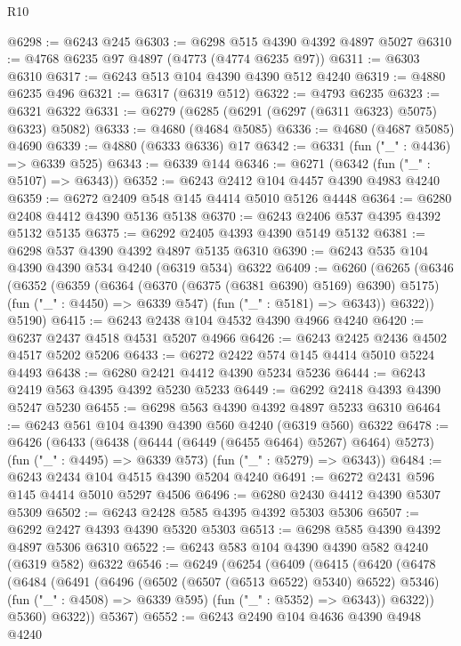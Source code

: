 \begin{lexlean}{R10}
\begin{coremodule}
@6298 := @6243 @245
@6303 := @6298 @515 @4390 @4392 @4897 @5027
@6310 := @4768 @6235 @97 @4897 (@4773 (@4774 @6235 @97))
@6311 := @6303 @6310
@6317 := @6243 @513 @104 @4390 @4390 @512 @4240
@6319 := @4880 @6235 @496
@6321 := @6317 (@6319 @512)
@6322 := @4793 @6235
@6323 := @6321 @6322
@6331 := @6279 (@6285 (@6291 (@6297 (@6311 @6323) @5075) @6323) @5082)
@6333 := @4680 (@4684 @5085)
@6336 := @4680 (@4687 @5085) @4690
@6339 := @4880 (@6333 @6336) @17
@6342 := @6331 (fun ("_" : @4436) => @6339 @525)
@6343 := @6339 @144
@6346 := @6271 (@6342 (fun ("_" : @5107) => @6343))
@6352 := @6243 @2412 @104 @4457 @4390 @4983 @4240
@6359 := @6272 @2409 @548 @145 @4414 @5010 @5126 @4448
@6364 := @6280 @2408 @4412 @4390 @5136 @5138
@6370 := @6243 @2406 @537 @4395 @4392 @5132 @5135
@6375 := @6292 @2405 @4393 @4390 @5149 @5132
@6381 := @6298 @537 @4390 @4392 @4897 @5135 @6310
@6390 := @6243 @535 @104 @4390 @4390 @534 @4240 (@6319 @534) @6322
@6409 := @6260
    (@6265
      (@6346
        (@6352
          (@6359
            (@6364 (@6370 (@6375 (@6381 @6390) @5169) @6390) @5175)
            (fun ("_" : @4450) => @6339 @547)
            (fun ("_" : @5181) => @6343))
          @6322))
      @5190)
@6415 := @6243 @2438 @104 @4532 @4390 @4966 @4240
@6420 := @6237 @2437 @4518 @4531 @5207 @4966
@6426 := @6243 @2425 @2436 @4502 @4517 @5202 @5206
@6433 := @6272 @2422 @574 @145 @4414 @5010 @5224 @4493
@6438 := @6280 @2421 @4412 @4390 @5234 @5236
@6444 := @6243 @2419 @563 @4395 @4392 @5230 @5233
@6449 := @6292 @2418 @4393 @4390 @5247 @5230
@6455 := @6298 @563 @4390 @4392 @4897 @5233 @6310
@6464 := @6243 @561 @104 @4390 @4390 @560 @4240 (@6319 @560) @6322
@6478 := @6426
    (@6433
      (@6438 (@6444 (@6449 (@6455 @6464) @5267) @6464) @5273)
      (fun ("_" : @4495) => @6339 @573)
      (fun ("_" : @5279) => @6343))
@6484 := @6243 @2434 @104 @4515 @4390 @5204 @4240
@6491 := @6272 @2431 @596 @145 @4414 @5010 @5297 @4506
@6496 := @6280 @2430 @4412 @4390 @5307 @5309
@6502 := @6243 @2428 @585 @4395 @4392 @5303 @5306
@6507 := @6292 @2427 @4393 @4390 @5320 @5303
@6513 := @6298 @585 @4390 @4392 @4897 @5306 @6310
@6522 := @6243 @583 @104 @4390 @4390 @582 @4240 (@6319 @582) @6322
@6546 := @6249
    (@6254
      (@6409
        (@6415
          (@6420
            (@6478
              (@6484
                (@6491
                  (@6496 (@6502 (@6507 (@6513 @6522) @5340) @6522) @5346)
                  (fun ("_" : @4508) => @6339 @595)
                  (fun ("_" : @5352) => @6343))
                @6322))
            @5360)
          @6322))
      @5367)
@6552 := @6243 @2490 @104 @4636 @4390 @4948 @4240

\end{coremodule}
\end{lexlean}
